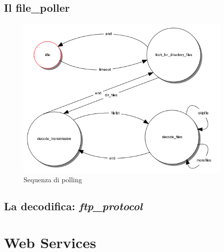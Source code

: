 \subsection{Il file\_poller}
%
\begin{figure}[!h]
\centering
\includegraphics[width=300pt]{img/file-poller.png}
\caption{Sequenza di polling}
\end{figure}
%
\subsection{La decodifica: \emph{ftp\_protocol}}

\section{Web Services}
